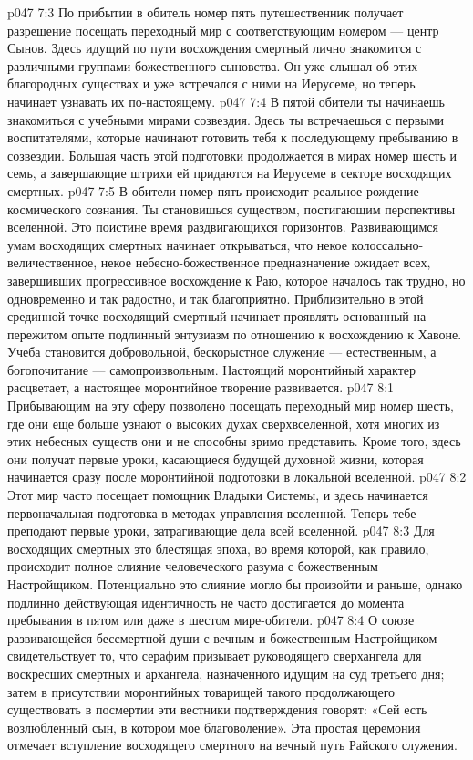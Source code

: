 \vs p047 7:3 По прибытии в обитель номер пять путешественник получает разрешение посещать переходный мир с соответствующим номером --- центр Сынов. Здесь идущий по пути восхождения смертный лично знакомится с различными группами божественного сыновства. Он уже слышал об этих благородных существах и уже встречался с ними на Иерусеме, но теперь начинает узнавать их по\hyp{}настоящему.
\vs p047 7:4 В пятой обители ты начинаешь знакомиться с учебными мирами созвездия. Здесь ты встречаешься с первыми воспитателями, которые начинают готовить тебя к последующему пребыванию в созвездии. Большая часть этой подготовки продолжается в мирах номер шесть и семь, а завершающие штрихи ей придаются на Иерусеме в секторе восходящих смертных.
\vs p047 7:5 В обители номер пять происходит реальное рождение космического сознания. Ты становишься существом, постигающим перспективы вселенной. Это поистине время раздвигающихся горизонтов. Развивающимся умам восходящих смертных начинает открываться, что некое колоссально\hyp{}величественное, некое небесно\hyp{}божественное предназначение ожидает всех, завершивших прогрессивное восхождение к Раю, которое началось так трудно, но одновременно и так радостно, и так благоприятно. Приблизительно в этой срединной точке восходящий смертный начинает проявлять основанный на пережитом опыте подлинный энтузиазм по отношению к восхождению к Хавоне. Учеба становится добровольной, бескорыстное служение --- естественным, а богопочитание --- самопроизвольным. Настоящий моронтийный характер расцветает, а настоящее моронтийное творение развивается.
\vs p047 8:1 Прибывающим на эту сферу позволено посещать переходный мир номер шесть, где они еще больше узнают о высоких духах сверхвселенной, хотя многих из этих небесных существ они и не способны зримо представить. Кроме того, здесь они получат первые уроки, касающиеся будущей духовной жизни, которая начинается сразу после моронтийной подготовки в локальной вселенной.
\vs p047 8:2 Этот мир часто посещает помощник Владыки Системы, и здесь начинается первоначальная подготовка в методах управления вселенной. Теперь тебе преподают первые уроки, затрагивающие дела всей вселенной.
\vs p047 8:3 \pc Для восходящих смертных это блестящая эпоха, во время которой, как правило, происходит полное слияние человеческого разума с божественным Настройщиком. Потенциально это слияние могло бы произойти и раньше, однако подлинно действующая идентичность не часто достигается до момента пребывания в пятом или даже в шестом мире\hyp{}обители.
\vs p047 8:4 \pc О союзе развивающейся бессмертной души с вечным и божественным Настройщиком свидетельствует то, что серафим призывает руководящего сверхангела для воскресших смертных и архангела, назначенного идущим на суд третьего дня; затем в присутствии моронтийных товарищей такого продолжающего существовать в посмертии эти вестники подтверждения говорят: «Сей есть возлюбленный сын, в котором мое благоволение». Эта простая церемония отмечает вступление восходящего смертного на вечный путь Райского служения.

